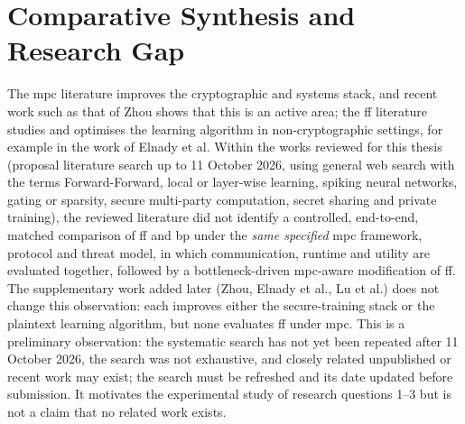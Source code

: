\section{Comparative Synthesis and Research Gap}\label{sec:lr-gap}
The \ac{mpc} literature improves the cryptographic and systems stack, and recent work such as that of Zhou shows that this is an active area; the \ac{ff} literature studies and optimises the learning algorithm in non-cryptographic settings, for example in the work of Elnady et al. Within the works reviewed for this thesis (proposal literature search up to 11 October 2026, using general web search with the terms Forward-Forward, local or layer-wise learning, spiking neural networks, gating or sparsity, secure multi-party computation, secret sharing and private training), the reviewed literature did not identify a controlled, end-to-end, matched comparison of \ac{ff} and \ac{bp} under the \emph{same specified} \ac{mpc} framework, protocol and threat model, in which communication, runtime and utility are evaluated together, followed by a bottleneck-driven \ac{mpc}-aware modification of \ac{ff}. The supplementary work added later (Zhou, Elnady et al., Lu et al.) does not change this observation: each improves either the secure-training stack or the plaintext learning algorithm, but none evaluates \ac{ff} under \ac{mpc}. This is a preliminary observation: the systematic search has not yet been repeated after 11 October 2026, the search was not exhaustive, and closely related unpublished or recent work may exist; the search must be refreshed and its date updated before submission. It motivates the experimental study of research questions 1--3 but is not a claim that no related work exists.
